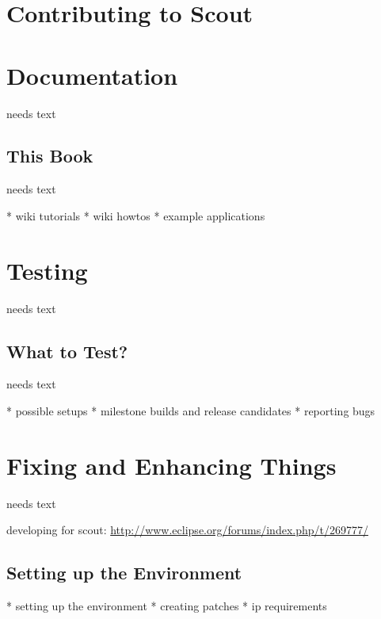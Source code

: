 \documentclass[a4paper,10pt,twoside]{book}
\begin{document}
  \sloppy
\fi


\chapter{Contributing to Scout}

\chapter{Documentation}
needs text

\section{This Book}
needs text

  * wiki tutorials
  * wiki howtos
  * example applications

\chapter{Testing}
needs text

\section{What to Test?}
needs text

  * possible setups
  * milestone builds and release candidates
  * reporting bugs
  
\chapter{Fixing and Enhancing Things}
needs text

developing for scout: \url{http://www.eclipse.org/forums/index.php/t/269777/}

\section{Setting up the Environment}
  * setting up the environment
  * creating patches
  * ip requirements


\ifx\wholebook\relax\else
   
   
\end{document}
